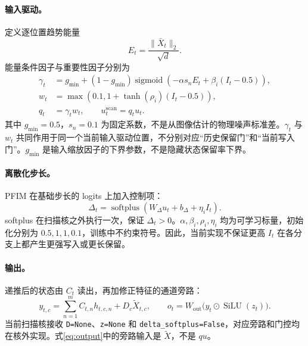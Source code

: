 \documentclass[UTF8,11pt,a4paper,fontset=fandol]{ctexart}
\newcommand{\sigmoid}{\operatorname{sigmoid}}
\newcommand{\softplus}{\operatorname{softplus}}
\newcommand{\SiLU}{\operatorname{SiLU}}
\begin{document}
\paragraph{输入驱动。}
定义逐位置趋势能量
\begin{equation}
E_t=\frac{\|\bar X_t\|_2}{\sqrt d}.
\end{equation}
能量条件因子与重要性因子分别为
\begin{align}
\gamma_t&=g_{\min}+(1-g_{\min})
 \sigmoid\!\left(-\alpha s_nE_t+\beta_i(I_t-0.5)\right),\\
w_t&=\max\!\left(0.1,1+\tanh(\rho_i)(I_t-0.5)\right),\\
q_t&=\gamma_tw_t,\qquad u^{\mathrm{scan}}_t=q_tu_t .
\label{eq:drive}
\end{align}
其中 $g_{\min}=0.5$，$s_n=0.1$ 为固定系数，不是从图像估计的物理噪声标准差。$\gamma_t$ 与 $w_t$ 共同作用于同一个当前输入驱动位置，不分别对应“历史保留门”和“当前写入门”。$g_{\min}$ 是输入缩放因子的下界参数，不是隐藏状态保留率下界。

\paragraph{离散化步长。}
PFIM 在基础步长的 logits 上加入控制项：
\begin{equation}
\Delta_t=\softplus(W_\Delta u_t+b_\Delta+\eta_i I_t).
\label{eq:delta}
\end{equation}
softplus 在扫描核之外执行一次，保证 $\Delta_t>0$。$\alpha,\beta_i,\rho_i,\eta_i$ 均为可学习标量，初始化分别为 $0.5,1,1,0.1$，训练中不约束符号。因此，当前实现不保证更高 $I_t$ 在各分支上都产生更强写入或更长保留。

\paragraph{输出。}
递推后的状态由 $C_t$ 读出，再加修正特征的通道旁路：
\begin{equation}
y_{t,c}=\sum_{n=1}^{m}C_{t,n}h_{t,c,n}+D_c\widetilde X_{t,c},
\qquad o_t=W_{\mathrm{out}}\bigl(y_t\odot\SiLU(z_t)\bigr).
\label{eq:output}
\end{equation}
当前扫描核接收 \texttt{D=None}、\texttt{z=None} 和 \texttt{delta\_softplus=False}，对应旁路和门控均在核外实现。式\eqref{eq:output}中的旁路输入是 $\widetilde X$，不是 $q u$。
\end{document}
